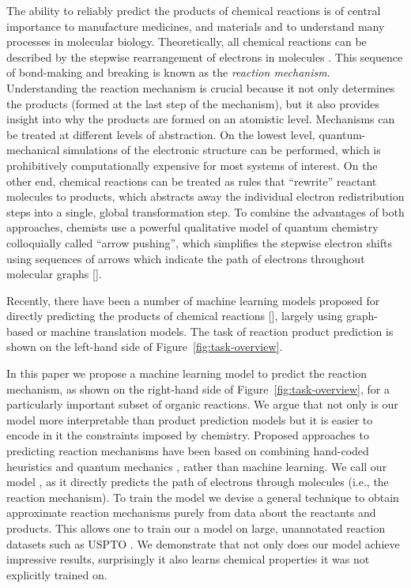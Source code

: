 
The ability to reliably predict the products of chemical reactions is of central importance to manufacture medicines, and materials and to understand many processes in molecular biology.
Theoretically, all chemical reactions can be described by the stepwise rearrangement of electrons in molecules \cite{herges1994organizing}. 
This sequence of bond-making and breaking is known as the \emph{reaction mechanism}. 
Understanding the reaction mechanism is crucial because it not only determines the products (formed at the last step of the mechanism), 
but it also provides insight into why the products are formed on an atomistic level. 
%
Mechanisms can be treated at different levels of abstraction. 
On the lowest level, quantum-mechanical simulations of the electronic structure can be performed, which is prohibitively computationally expensive for most systems of interest. 
On the other end, chemical reactions can be treated as rules that ``rewrite'' reactant molecules to products, which abstracts away the individual electron redistribution steps into a single, global transformation step. 
To combine the advantages of both approaches, chemists use a powerful qualitative model of quantum chemistry colloquially called ``arrow pushing'', which simplifies the stepwise electron shifts using sequences of arrows which indicate the path of electrons throughout molecular graphs [\cite{herges1994organizing}]. 

Recently, there have been a number of machine learning models proposed for directly predicting the products of chemical reactions [\cite{coley2017prediction,jin2017predicting,schwaller2017found,neural-symbolic,segler2018planning,wei2016neural}], largely using graph-based or machine translation models. 
The task of reaction product prediction is shown on the left-hand side of Figure~\ref{fig:task-overview}. 

In this paper we propose a machine learning model to predict the reaction mechanism, as shown on the right-hand side of Figure~\ref{fig:task-overview}, for a particularly important subset of organic reactions.
We argue that not only is our model more interpretable than product prediction models but it is easier to encode in it the constraints imposed by chemistry. 
Proposed approaches to predicting reaction mechanisms have been based on combining hand-coded heuristics and quantum mechanics \cite{bergeler2015heuristics,kim2018efficient,nandi2017tabu,rappoport2014complex,simm2017context,zimmerman2013automated}, 
rather than machine learning.
We call our model \ourModel, as it directly predicts the path of electrons through molecules (i.e., the reaction mechanism). 
To train the model we devise a general technique to obtain approximate reaction mechanisms purely from data about the reactants and products. 
This allows one to train our a model on large, unannotated reaction datasets such as USPTO \cite{lowe2012extraction}. We demonstrate that not only does our model achieve impressive results, surprisingly it also learns chemical properties it was not explicitly trained on.



